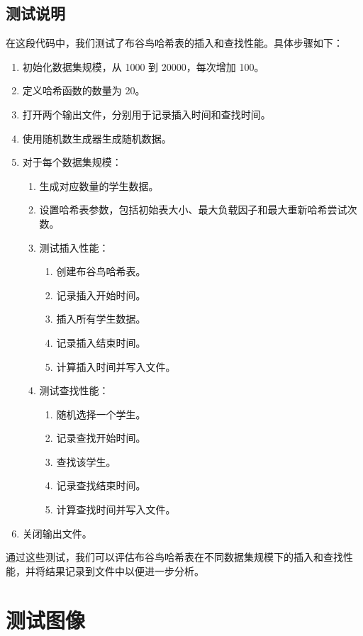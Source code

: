 \documentclass[UTF8]{ctexart}
\begin{document}
\subsection{测试说明}
在这段代码中，我们测试了布谷鸟哈希表的插入和查找性能。具体步骤如下：

\begin{enumerate}
    \item 初始化数据集规模，从 1000 到 20000，每次增加 100。
    \item 定义哈希函数的数量为 20。
    \item 打开两个输出文件，分别用于记录插入时间和查找时间。
    \item 使用随机数生成器生成随机数据。
    \item 对于每个数据集规模：
    \begin{enumerate}
        \item 生成对应数量的学生数据。
        \item 设置哈希表参数，包括初始表大小、最大负载因子和最大重新哈希尝试次数。
        \item 测试插入性能：
        \begin{enumerate}
            \item 创建布谷鸟哈希表。
            \item 记录插入开始时间。
            \item 插入所有学生数据。
            \item 记录插入结束时间。
            \item 计算插入时间并写入文件。
        \end{enumerate}
        \item 测试查找性能：
        \begin{enumerate}
            \item 随机选择一个学生。
            \item 记录查找开始时间。
            \item 查找该学生。
            \item 记录查找结束时间。
            \item 计算查找时间并写入文件。
        \end{enumerate}
    \end{enumerate}
    \item 关闭输出文件。
\end{enumerate}

通过这些测试，我们可以评估布谷鸟哈希表在不同数据集规模下的插入和查找性能，并将结果记录到文件中以便进一步分析。

\section{测试图像}
\end{document}
